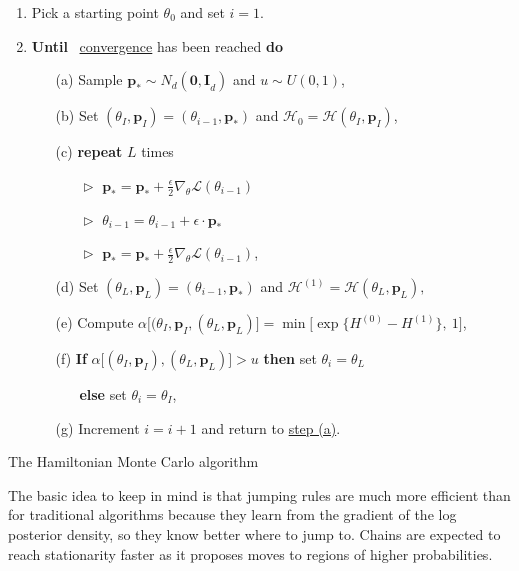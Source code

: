 \begin{algorithm}[H]\label{algo_hmc}
	\SetAlgoLined
	\begin{enumerate}
		\item Pick a starting point $\theta_0$ and set $i=1$.
		\item \textbf{Until} \ \underline{convergence} has been reached \quad \textbf{do}
		\begin{itemize}
			\item[(a)]\label{item1hmc} Sample $\boldsymbol{p}_*\sim N_d(\boldsymbol{0,I}_d)$ and $ u\sim U(0,1)$,
			\item[(b)] Set $(\theta_I,\boldsymbol{p}_I)=(\theta_{i-1},\boldsymbol{p_*})$ and $\mathcal{H}_0=\mathcal{H}(\theta_I,\boldsymbol{p}_I)$,
			\item[(c)] \textbf{repeat} $L$ times 
			\begin{itemize}
				\item[$\vartriangleright$] $ \boldsymbol{p}_*=\boldsymbol{p}_*+\frac{\epsilon}{2}\nabla_{\theta}\mathcal{L}(\theta_{i-1}) $
				\item[$\vartriangleright$] $\theta_{i-1}=\theta_{i-1}+\epsilon\cdot\boldsymbol{p}_*$
				\item[$\vartriangleright$] $ \boldsymbol{p}_*=\boldsymbol{p}_*+\frac{\epsilon}{2}\nabla_{\theta}\mathcal{L}(\theta_{i-1})$,
			\end{itemize}
			\item[(d)] Set $(\theta_L,\boldsymbol{p}_L)=(\theta_{i-1},\boldsymbol{p}_*)$ and $\mathcal{H}^{(1)}=\mathcal{H}(\theta_L,\boldsymbol{p}_L),$
			\item[(e)] Compute $\alpha\Big[(\theta_I,\boldsymbol{p}_I,(\theta_L,\boldsymbol{p}_L)\Big]=\min\Big[\exp\big\{H^{(0)}-H^{(1)}\big\},\ 1\Big]$,
			\item[(f)] \textbf{If}  $\alpha\Big[(\theta_I,\boldsymbol{p}_I),(\theta_L,\boldsymbol{p}_L)\Big]>u$  \textbf{then}  	set $\theta_i=\theta_L$ 
			\begin{itemize}
				\item[] \textbf{else}   set $\theta_i=\theta_I$,
			\end{itemize}
            \item[(g)]  Increment $i=i+1$ and return to \hyperref[item1hmc]{step (a)}.
		\end{itemize}
	\end{enumerate}
	\caption{The Hamiltonian Monte Carlo algorithm}
\end{algorithm}

The basic idea to keep in mind is that jumping rules are much more efficient than for traditional algorithms because they
 learn from the gradient of the log posterior density, so they know better
where to jump to.
Chains are expected to reach stationarity faster as it proposes moves to regions of higher probabilities.


